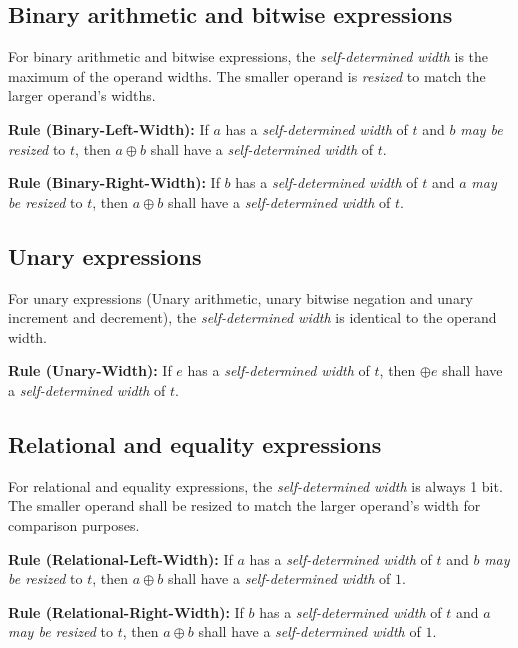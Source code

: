 \documentclass{article}
\newcommand{\sds}{\emph{self-determined width}}
\newcommand{\mbr}{\emph{may be resized}}
\newenvironment{typingrule}[1]%
{\par\noindent\textbf{Rule (#1):} }%
{\par}
\begin{document}
\subsection{Binary arithmetic and bitwise expressions}%

For binary arithmetic and bitwise expressions, the \sds{}
is the maximum of the operand widths. The smaller operand is \emph{resized}
to match the larger operand's widths.

\begin{typingrule}{Binary-Left-Width}
  If $a$ has a \sds{} of $t$ and $b$ \mbr{}
  to $t$, then $a \oplus b$ shall have a \sds{} of $t$.
\end{typingrule}

\begin{typingrule}{Binary-Right-Width}
  If $b$ has a \sds{} of $t$ and $a$ \mbr{}
  to $t$, then $a \oplus b$ shall have a \sds{} of $t$.
\end{typingrule}

\subsection{Unary expressions}%

For unary expressions (Unary arithmetic, unary bitwise negation and unary
increment and decrement), the \sds{} is identical to the
operand width.

\begin{typingrule}{Unary-Width}
  If $e$ has a \sds{} of $t$, then $\oplus e$ shall have
  a \sds{} of $t$.
\end{typingrule}

\subsection{Relational and equality expressions}%

For relational and equality expressions, the \sds{} is
always 1 bit. The smaller operand shall be resized to match the larger operand's
width for comparison purposes.

\begin{typingrule}{Relational-Left-Width}
  If $a$ has a \sds{} of $t$ and $b$ \mbr{}
  to $t$, then $a \oplus b$ shall have a \sds{} of $1$.
\end{typingrule}

\begin{typingrule}{Relational-Right-Width}
  If $b$ has a \sds{} of $t$ and $a$ \mbr{}
  to $t$, then $a \oplus b$ shall have a \sds{} of $1$.
\end{typingrule}
\end{document}
